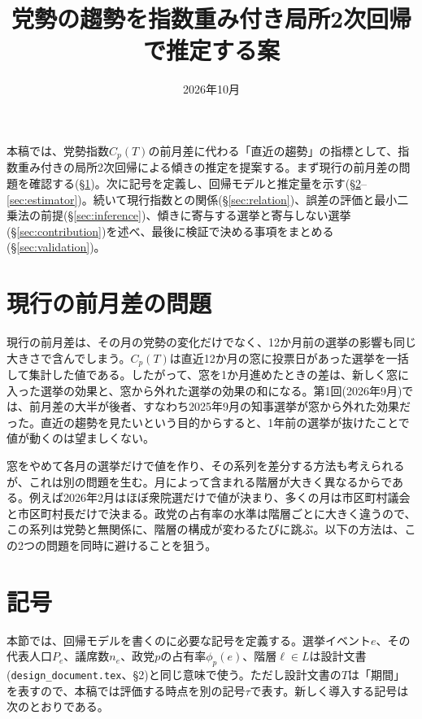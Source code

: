 \documentclass[a4paper,11pt]{ltjsarticle}
\title{党勢の趨勢を指数重み付き局所2次回帰で推定する案}
\author{}
\date{2026年10月}
\begin{document}
\maketitle

本稿では、党勢指数$C_p(T)$の前月差に代わる「直近の趨勢」の指標として、指数重み付きの局所2次回帰による傾きの推定を提案する。まず現行の前月差の問題を確認する(\S\ref{sec:problem})。次に記号を定義し、回帰モデルと推定量を示す(\S\ref{sec:notation}--\ref{sec:estimator})。続いて現行指数との関係(\S\ref{sec:relation})、誤差の評価と最小二乗法の前提(\S\ref{sec:inference})、傾きに寄与する選挙と寄与しない選挙(\S\ref{sec:contribution})を述べ、最後に検証で決める事項をまとめる(\S\ref{sec:validation})。

\section{現行の前月差の問題}
\label{sec:problem}

現行の前月差は、その月の党勢の変化だけでなく、12か月前の選挙の影響も同じ大きさで含んでしまう。$C_p(T)$は直近12か月の窓に投票日があった選挙を一括して集計した値である。したがって、窓を1か月進めたときの差は、新しく窓に入った選挙の効果と、窓から外れた選挙の効果の和になる。第1回(2026年9月)では、前月差の大半が後者、すなわち2025年9月の知事選挙が窓から外れた効果だった。直近の趨勢を見たいという目的からすると、1年前の選挙が抜けたことで値が動くのは望ましくない。

窓をやめて各月の選挙だけで値を作り、その系列を差分する方法も考えられるが、これは別の問題を生む。月によって含まれる階層が大きく異なるからである。例えば2026年2月はほぼ衆院選だけで値が決まり、多くの月は市区町村議会と市区町村長だけで決まる。政党の占有率の水準は階層ごとに大きく違うので、この系列は党勢と無関係に、階層の構成が変わるたびに跳ぶ。以下の方法は、この2つの問題を同時に避けることを狙う。

\section{記号}
\label{sec:notation}

本節では、回帰モデルを書くのに必要な記号を定義する。選挙イベント$e$、その代表人口$P_e$、議席数$n_e$、政党$p$の占有率$\phi_p(e)$、階層$\ell\in L$は設計文書(\texttt{design\_document.tex}、\S2)と同じ意味で使う。ただし設計文書の$T$は「期間」を表すので、本稿では評価する時点を別の記号$\tau$で表す。新しく導入する記号は次のとおりである。
\end{document}

